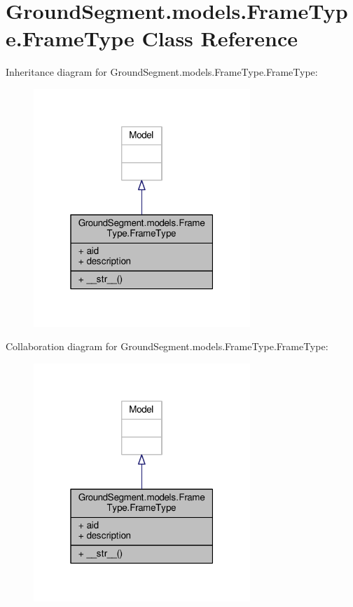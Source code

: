 \hypertarget{class_ground_segment_1_1models_1_1_frame_type_1_1_frame_type}{}\section{Ground\+Segment.\+models.\+Frame\+Type.\+Frame\+Type Class Reference}
\label{class_ground_segment_1_1models_1_1_frame_type_1_1_frame_type}


Inheritance diagram for Ground\+Segment.\+models.\+Frame\+Type.\+Frame\+Type\+:\nopagebreak
\begin{figure}[H]
\begin{center}
\leavevmode
\includegraphics[width=232pt]{class_ground_segment_1_1models_1_1_frame_type_1_1_frame_type__inherit__graph}
\end{center}
\end{figure}


Collaboration diagram for Ground\+Segment.\+models.\+Frame\+Type.\+Frame\+Type\+:\nopagebreak
\begin{figure}[H]
\begin{center}
\leavevmode
\includegraphics[width=232pt]{class_ground_segment_1_1models_1_1_frame_type_1_1_frame_type__coll__graph}
\end{center}
\end{figure}
